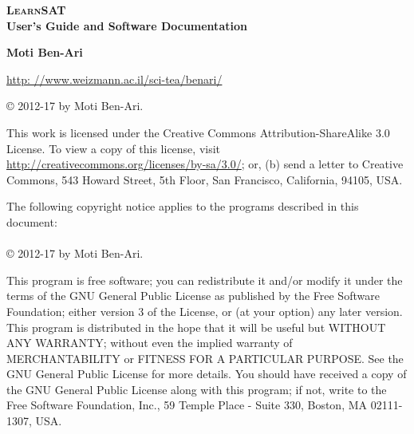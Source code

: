 \documentclass[11pt]{article}
\newcommand*{\ls}{\textsc{LearnSAT}}
\begin{document}
\thispagestyle{empty}

\thispagestyle{empty}

\begin{center}

\textbf{\huge \ls\\\bigskip{}User's Guide and Software Documentation}

\bigskip
\bigskip

\textbf{\LARGE Moti Ben-Ari}

\bigskip
\bigskip

\large\url{http: //www.weizmann.ac.il/sci-tea/benari/}

\bigskip



\end{center}

\vspace*{\fill}


\begin{center}
\copyright{} 2012-17 by Moti Ben-Ari.
\end{center}
This work is licensed under the Creative Commons Attribution-ShareAlike 3.0
License. To view a copy of this license, visit
\url{http://creativecommons.org/licenses/by-sa/3.0/}; or, (b) send a letter
to Creative Commons, 543 Howard Street, 5th Floor, San Francisco,
California, 94105, USA.

\bigskip\bigskip

 
\begin{center}
The following copyright notice applies to the programs described in this
document:\mbox{}\\\mbox{}\\
\copyright{} 2012-17 by Moti Ben-Ari.
\end{center}

This program is free software; you can redistribute it and/or
modify it under the terms of the GNU General Public License
as published by the Free Software Foundation; either version 3
of the License, or (at your option) any later version.
This program is distributed in the hope that it will be useful
but WITHOUT ANY WARRANTY; without even the implied warranty of
MERCHANTABILITY or FITNESS FOR A PARTICULAR PURPOSE.
See the GNU General Public License for more details.
You should have received a copy of the GNU General Public License
along with this program; if not, write to the Free Software
Foundation, Inc., 59 Temple Place - Suite 330, Boston, MA
02111-1307, USA.

\newpage
\end{document}
